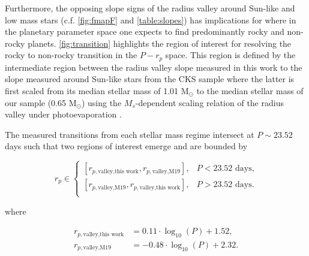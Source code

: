 \documentclass[twocolumn]{emulateapj}
\begin{document}
Furthermore, the opposing slope signs of the radius valley around Sun-like and low mass
stars (c.f. \autoref{fig:fmapF} and \autoref{table:slopes})
has implications for where in the planetary parameter space one expects to find
predominantly rocky and non-rocky planets. \autoref{fig:transition} highlights the region of interest for resolving
the rocky to non-rocky transition in the $P-r_p$ space. This region is defined by the intermediate region between the
radius valley slope measured in this work to the slope measured around Sun-like stars from the CKS sample \citep{martinez19}
where the latter is first scaled
from its median stellar mass of 1.01 M$_{\odot}$ to the median stellar mass of our sample (0.65 M$_{\odot}$) using the
$M_s$-dependent scaling relation of the radius valley under photoevaporation \citep{wu19}.

The measured transitions from each stellar mass regime
intersect at $P\sim 23.52$ days such that two regions of interest emerge and are bounded by

\begin{equation}
  r_p \in 
  \begin{cases}
        [r_{p,\text{valley,this work}}, r_{p,\text{valley,M19}}], & P < 23.52 \text{ days,} \\
        [r_{p,\text{valley,M19}}, r_{p,\text{valley,this work}}], & P > 23.52 \text{ days.} \\
  \end{cases}  \label{eq:transition}
\end{equation}

\noindent where

\begin{align}
  r_{p,\text{valley,this work}} &= 0.11\cdot \log_{10}(P)+1.52, \\
  r_{p,\text{valley,M19}} &= -0.48\cdot \log_{10}(P)+2.32.
\end{align}
\end{document}
